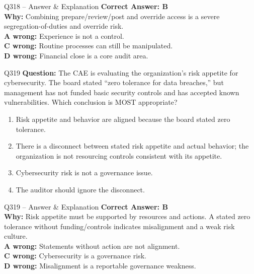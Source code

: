 \documentclass[aspectratio=169,10pt]{beamer}
\begin{document}
	\begin{frame}[t]{Q318 -- Answer \& Explanation}
		\small
		\textbf{Correct Answer: B} \\[4pt]
		\textbf{Why:} Combining prepare/review/post and override access is a severe segregation-of-duties and override risk. \\[4pt]
		\textbf{A wrong:} Experience is not a control. \\[2pt]
		\textbf{C wrong:} Routine processes can still be manipulated. \\[2pt]
		\textbf{D wrong:} Financial close is a core audit area.
	\end{frame}
	
	\begin{frame}[t]{Q319}
		\small
		\textbf{Question:} The CAE is evaluating the organization's risk appetite for cybersecurity. The board stated ``zero tolerance for data breaches,'' but management has not funded basic security controls and has accepted known vulnerabilities. Which conclusion is MOST appropriate?
		\begin{enumerate}[label=\Alph*.,itemsep=1pt,topsep=2pt]
			\item Risk appetite and behavior are aligned because the board stated zero tolerance.
			\item There is a disconnect between stated risk appetite and actual behavior; the organization is not resourcing controls consistent with its appetite.
			\item Cybersecurity risk is not a governance issue.
			\item The auditor should ignore the disconnect.
		\end{enumerate}
	\end{frame}
	
	\begin{frame}[t]{Q319 -- Answer \& Explanation}
		\small
		\textbf{Correct Answer: B} \\[4pt]
		\textbf{Why:} Risk appetite must be supported by resources and actions. A stated zero tolerance without funding/controls indicates misalignment and a weak risk culture. \\[4pt]
		\textbf{A wrong:} Statements without action are not alignment. \\[2pt]
		\textbf{C wrong:} Cybersecurity is a governance risk. \\[2pt]
		\textbf{D wrong:} Misalignment is a reportable governance weakness.
	\end{frame}
	
\end{document}
